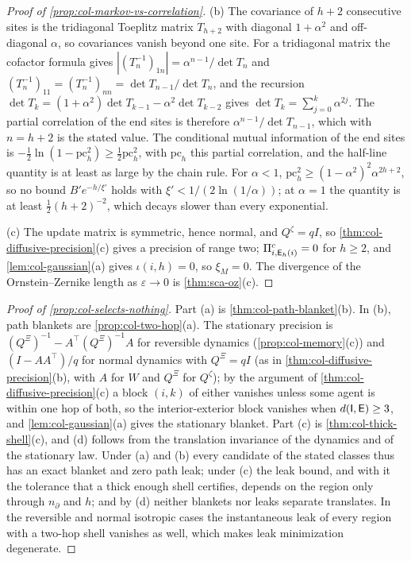 \begin{proof}[Proof of \cref{prop:col-markov-vs-correlation}]
(b) The covariance of $h+2$ consecutive sites is the tridiagonal Toeplitz matrix $T_{h+2}$ with diagonal $1+\alpha^2$ and off-diagonal $\alpha$, so covariances vanish beyond one site. For a tridiagonal matrix the cofactor formula gives $|(T_n^{-1})_{1n}|=\alpha^{n-1}/\det T_n$ and $(T_n^{-1})_{11}=(T_n^{-1})_{nn}=\det T_{n-1}/\det T_n$, and the recursion $\det T_k=(1+\alpha^2)\det T_{k-1}-\alpha^2\det T_{k-2}$ gives $\det T_k=\sum_{j=0}^k\alpha^{2j}$. The partial correlation of the end sites is therefore $\alpha^{n-1}/\det T_{n-1}$, which with $n=h+2$ is the stated value. The conditional mutual information of the end sites is $-\frac12\ln(1-\mathrm{pc}_h^2)\ge\frac12\mathrm{pc}_h^2$, with $\mathrm{pc}_h$ this partial correlation, and the half-line quantity is at least as large by the chain rule. For $\alpha<1$, $\mathrm{pc}_h^2\ge(1-\alpha^2)^2\alpha^{2h+2}$, so no bound $B'e^{-h/\xi'}$ holds with $\xi'<1/(2\ln(1/\alpha))$; at $\alpha=1$ the quantity is at least $\frac12(h+2)^{-2}$, which decays slower than every exponential.

(c) The update matrix is symmetric, hence normal, and $Q^{\zeta}=qI$, so \cref{thm:col-diffusive-precision}(c) gives a precision of range two; $\Pi^c_{i,\mathsf{E}_h(i)}=0$ for $h\ge2$, and \cref{lem:col-gaussian}(a) gives $\iota(i,h)=0$, so $\xi_M=0$. The divergence of the Ornstein--Zernike length as $\varepsilon\to0$ is \cref{thm:sca-oz}(c).
\end{proof}

\begin{proof}[Proof of \cref{prop:col-selects-nothing}]
Part (a) is \cref{thm:col-path-blanket}(b). In (b), path blankets are \cref{prop:col-two-hop}(a). The stationary precision is $(Q^{\Xi})^{-1}-A^\top(Q^{\Xi})^{-1}A$ for reversible dynamics (\cref{prop:col-memory}(c)) and $(I-AA^\top)/q$ for normal dynamics with $Q^{\Xi}=qI$ (as in \cref{thm:col-diffusive-precision}(b), with $A$ for $W$ and $Q^{\Xi}$ for $Q^\zeta$); by the argument of \cref{thm:col-diffusive-precision}(c) a block $(i,k)$ of either vanishes unless some agent is within one hop of both, so the interior-exterior block vanishes when $d(\mathsf{I},\mathsf{E})\ge3$, and \cref{lem:col-gaussian}(a) gives the stationary blanket. Part (c) is \cref{thm:col-thick-shell}(c), and (d) follows from the translation invariance of the dynamics and of the stationary law. Under (a) and (b) every candidate of the stated classes thus has an exact blanket and zero path leak; under (c) the leak bound, and with it the tolerance that a thick enough shell certifies, depends on the region only through $n_\partial$ and $h$; and by (d) neither blankets nor leaks separate translates. In the reversible and normal isotropic cases the instantaneous leak of every region with a two-hop shell vanishes as well, which makes leak minimization degenerate.
\end{proof}


